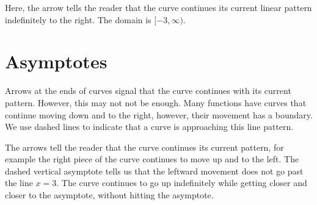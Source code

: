 \documentclass{ximera}
\begin{document}
Here, the arrow tells the reader that the curve continues its current linear pattern indefinitely to the right.  The domain is $[-3, \infty)$.











\section{Asymptotes}


Arrows at the ends of curves signal that the curve continues with its current pattern. However, this may not not be enough.  Many functions have curves that continue moving down and to the right, however, their movement has a boundary. We use dashed lines to indicate that a curve is approaching this line pattern.


\begin{image}
\end{image}


The arrows tell the reader that the curve continues its current pattern, for example the right piece of the curve continues to move up and to the left.  The dashed vertical asymptote tells us that the leftward movement does not go past the line $x=3$.  The curve continues to go up indefinitely while getting closer and closer to the asymptote, without hitting the asymptote. 
\end{document}
